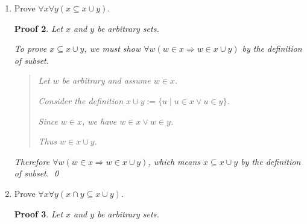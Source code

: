 \documentclass[12pt]{article}
\theoremstyle{proofstyle}
\newtheorem*{proof*}{Proof}
\begin{document}
\begin{enumerate}[left=0pt, itemsep=2em, parsep=1em]
\begin{enumerate}[label=(\alph*), itemsep=1.5em, leftmargin=2em]
\begin{proof*}
    Let $x$ and $y$ be arbitrary sets.
    
    To prove $x \cap y \subseteq x$, we must show $\forall w(w \in (x \cap y) \Rightarrow w \in x)$ by the definition of subset.
    
    \begin{quote}
        Let $w$ be arbitrary and assume $w \in (x \cap y)$.
        
        Since $x \cap y$ is an intersection of $x$ with $y$, we have 
        
        $\forall u(u \in x \cap y \Leftrightarrow ((u \in x) \wedge (u \in y)))$ by the definition of intersection of two sets.
        
        Thus $w \in x \wedge w \in y$.
        
        Therefore $w \in x$.
    \end{quote}
    
    Therefore $\forall w(w \in x \cap y \Rightarrow w \in x)$, which means $x \cap y \subseteq x$ by the definition of subset. \qed
\end{proof*}
\newpage

\item Prove $\forall x\forall y(x \subseteq x \cup y)$.

\begin{proof*}
    Let $x$ and $y$ be arbitrary sets.
    
    To prove $x \subseteq x \cup y$, we must show $\forall w(w \in x \Rightarrow w \in x \cup y)$ by the definition of subset.
    
    \begin{quote}
        Let $w$ be arbitrary and assume $w \in x$.
        
        Consider the definition $x \cup y := \{u \mid u \in x \vee u \in y\}$.
        
        Since $w \in x$, we have $w \in x \vee w \in y$.
        
        Thus $w \in x \cup y$.
    \end{quote}
    
    Therefore $\forall w(w \in x \Rightarrow w \in x \cup y)$, which means $x \subseteq x \cup y$ by the definition of subset. \qed
\end{proof*}
\item Prove $\forall x\forall y(x \cap y \subseteq x \cup y)$.

\begin{proof*}
    Let $x$ and $y$ be arbitrary sets.
    

\end{proof*}
\end{enumerate}
\end{enumerate}
\end{document}
